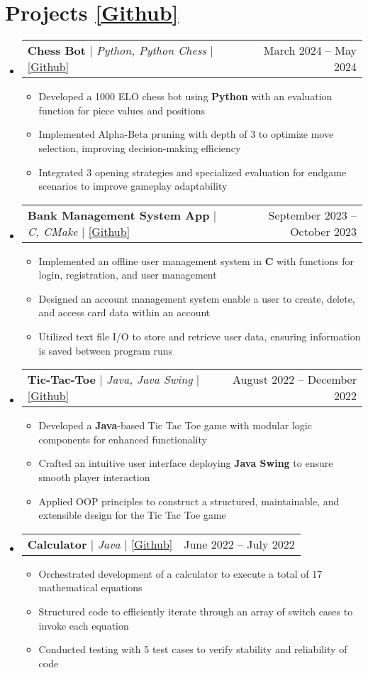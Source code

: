 \documentclass[letterpaper,11pt]{article}
\makeatletter
\newcommand{\resumeItem}[1]{
  \item\small{
    {#1 \vspace{-2pt}}
  }
}
\newcommand{\resumeProjectHeading}[2]{
    \item
    \begin{tabular*}{0.97\textwidth}{l@{\extracolsep{\fill}}r}
      \small#1 & #2 \\
    \end{tabular*}\vspace{-7pt}
}
\newcommand{\resumeSubHeadingListStart}{\begin{itemize}[leftmargin=0.15in, label={}]}
\newcommand{\resumeSubHeadingListEnd}{\end{itemize}}
\newcommand{\resumeItemListStart}{\begin{itemize}}
\newcommand{\resumeItemListEnd}{\end{itemize}\vspace{-5pt}}
\makeatother
\begin{document}
\section{Projects \small{\href{https://github.com/Dossr-NK/Personal-Projects}{\underline{[Github]}}}}
    \resumeSubHeadingListStart
      \resumeProjectHeading
        {\textbf{Chess Bot} $|$ \emph{Python, Python Chess} $|$ \small{\href{https://github.com/milesch0002/CPSC-481_Chess-Bot}{\underline{[Github]}}}}{March 2024 -- May 2024}
        \resumeItemListStart
          \resumeItem{Developed a 1000 ELO chess bot using \textbf{Python} with an evaluation function for piece values and positions}
          \resumeItem{Implemented Alpha-Beta pruning with depth of 3 to optimize move selection, improving decision-making efficiency}
          \resumeItem{Integrated 3 opening strategies and specialized evaluation for endgame scenarios to improve gameplay adaptability}
        \resumeItemListEnd
      \resumeProjectHeading
          {\textbf{Bank Management System App} $|$ \emph{C, CMake} $|$ \small{\href{https://github.com/Dossr-NK/Personal-Projects/tree/main/C/Bank\%20Management\%20System\%20App}{\underline{[Github]}}}}{September 2023 -- October 2023}
          \resumeItemListStart
            \resumeItem{Implemented an offline user management system in \textbf{C} with functions for login, registration, and user management}
            \resumeItem{Designed an account management system enable a user to create, delete, and access card data within an account}
            \resumeItem{Utilized text file I/O to store and retrieve user data, ensuring information is saved between program runs}
          \resumeItemListEnd
      \resumeProjectHeading
          {\textbf{Tic-Tac-Toe} $|$ \emph{Java, Java Swing} $|$ \small{\href{https://github.com/Dossr-NK/Personal-Projects/tree/main/Java/Tic\%20Tac\%20Toe}{\underline{[Github]}}}}{August 2022 -- December 2022}
          \resumeItemListStart
            \resumeItem{Developed a \textbf{Java}-based Tic Tac Toe game with modular logic components for enhanced functionality}
            \resumeItem{Crafted an intuitive user interface deploying \textbf{Java Swing} to ensure smooth player interaction}
            \resumeItem{Applied OOP principles to construct a structured, maintainable, and extensible design for the Tic Tac Toe game}
          \resumeItemListEnd
      \resumeProjectHeading
          {\textbf{Calculator} $|$ \emph{Java} $|$ \small{\href{https://github.com/Dossr-NK/Personal-Projects/tree/main/Java/Calculator\%20no\%20GUI}{\underline{[Github]}}}}{June 2022 -- July 2022}
        \resumeItemListStart
            \resumeItem{Orchestrated development of a calculator to execute a total of 17 mathematical equations}
            \resumeItem{Structured code to efficiently iterate through an array of switch cases to invoke each equation}
            \resumeItem{Conducted testing with 5 test cases to verify stability and reliability of code}
        \resumeItemListEnd
    \resumeSubHeadingListEnd
\end{document}
